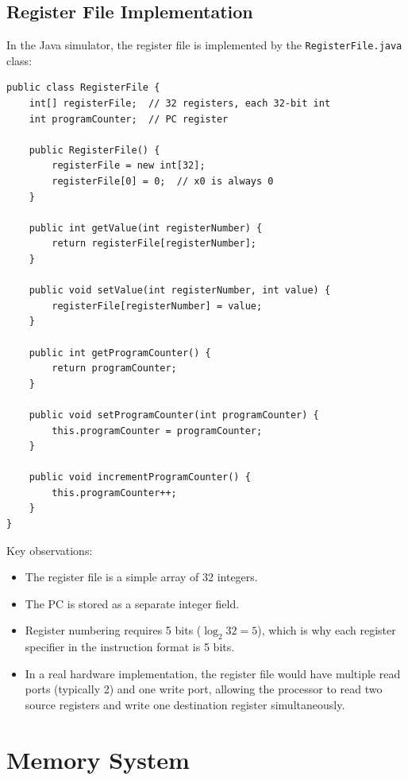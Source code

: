 \documentclass[12pt,a4paper]{article}
\begin{document}
\subsection{Register File Implementation}

In the Java simulator, the register file is implemented by the \texttt{RegisterFile.java} class:

\begin{lstlisting}[style=javastyle, caption={RegisterFile.java -- Simplified}]
public class RegisterFile {
    int[] registerFile;  // 32 registers, each 32-bit int
    int programCounter;  // PC register

    public RegisterFile() {
        registerFile = new int[32];
        registerFile[0] = 0;  // x0 is always 0
    }

    public int getValue(int registerNumber) {
        return registerFile[registerNumber];
    }

    public void setValue(int registerNumber, int value) {
        registerFile[registerNumber] = value;
    }

    public int getProgramCounter() {
        return programCounter;
    }

    public void setProgramCounter(int programCounter) {
        this.programCounter = programCounter;
    }

    public void incrementProgramCounter() {
        this.programCounter++;
    }
}
\end{lstlisting}

Key observations:
\begin{itemize}
    \item The register file is a simple array of 32 integers.
    \item The PC is stored as a separate integer field.
    \item Register numbering requires 5 bits ($\log_2 32 = 5$), which is why each register specifier in the instruction format is 5 bits.
    \item In a real hardware implementation, the register file would have multiple read ports (typically 2) and one write port, allowing the processor to read two source registers and write one destination register simultaneously.
\end{itemize}

\section{Memory System}
\end{document}
